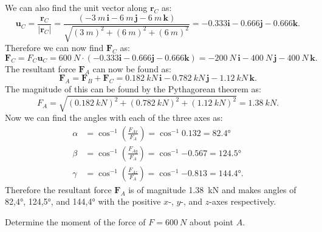 \documentclass[a4paper]{article}
\begin{document}
We can also find the unit vector along $\textbf{r}_C$ as:
\[ 
\textbf{u}_C = \frac{\textbf{r}_C}{\left| \textbf{r}_C \right|} = \frac{\left( - \qty{3}{m} \, \textbf{i} - \qty{6}{m} \, \textbf{j} - \qty{6}{m}\, \textbf{k} \right)}{\sqrt{\left( \qty{3}{m}  \right)^2 + \left( \qty{6}{m}  \right)^2 + \left( \qty{6}{m}  \right)^2}} = - \num{0,333} \textbf{i} - \num{0,666} \textbf{j} - \num{0,666} \textbf{k}
.\]
Therefore we can now find $\textbf{F}_C$ as:
\[ 
\textbf{F}_C = F_C \textbf{u}_C = \qty{600}{N} \cdot \left( -\num{0,333} \textbf{i} - \num{0,666} \textbf{j} - \num{0,666}  \textbf{k} \right) = - \qty{200}{N} \, \textbf{i} - \qty{400}{N} \, \textbf{j} - \qty{400}{N} \, \textbf{k}
.\]
The resultant force $\textbf{F}_A$ can now be found as:
\[ 
  \textbf{F}_A = \textbf{F}_B + \textbf{F}_C = \qty{0,182}{kN} \, \textbf{i} - \qty{0,782}{kN} \, \textbf{j} - \qty{1,12}{kN} \, \textbf{k}
.\]
The magnitude of this can be found by the Pythagorean theorem as:
\[ 
F_A = \sqrt{\left( \qty{0,182}{kN}  \right)^2 + \left( \qty{0,782}{kN}  \right)^2 +( \qty{1,12}{kN} )^2} = \qty{1,38}{kN} 
.\]
Now we can find the angles with each of the three axes as:
\begin{align*}
  \alpha &= \cos^{-1} \left( \frac{F_{Ax}}{F_A} \right) = \cos^{-1} \num{0,132} = \ang{82,4} \\
  \beta &= \cos^{-1} \left( \frac{F_{Ay}}{F_A} \right) = \cos^{-1} \num{-0,567} = \ang{124,5}  \\
  \gamma &= \cos^{-1} \left( \frac{F_{Az}}{F_A} \right) = \cos^{-1} \num{-0,813} = \ang{144,4} 
.\end{align*}
Therefore the resultant force $\textbf{F}_A$ is of magnitude \qty{1,38}{kN} and makes angles of \ang{82,4}, \ang{124,5}, and \ang{144,4} with the positive $x$-, $y$-, and $z$-axes respectively. 


Determine the moment of the force of $F = \qty{600}{N}$ about point $A$.
\end{document}
